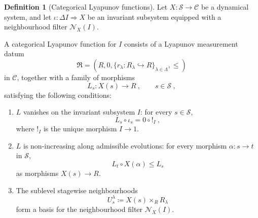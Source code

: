 \documentclass[a4paper,reqno,oneside]{amsart}
\theoremstyle{definition}
\newtheorem{definition}[theorem]{Definition}
\theoremstyle{remark}
\numberwithin{equation}{section}
\begin{document}
\begin{definition}[Categorical Lyapunov functions]\label{def: lyapunov function}
Let $ X\colon \mathcal S\to\mathcal C$ be a dynamical system, and let $ \iota\colon \Delta I\Rightarrow X$ be an invariant subsystem equipped with a neighbourhood filter $ \mathcal N_X(I)$.


A categorical Lyapunov function for $I$ consists of a Lyapunov measurement
datum
\begin{equation}
    \mathfrak R=(R,0,\{r_\lambda\colon R_\lambda\hookrightarrow R\}_{\lambda\in\Lambda},\leq)
\end{equation}
in $\mathcal C$, together with a family of morphisms
\begin{equation}
    L_s\colon X(s)\to R \ ,
    \qquad s\in\mathcal S \ ,
\end{equation}
satisfying the following conditions:

\begin{enumerate}
    \item $L$ vanishes on the invariant subsystem $I$: for every
    $s\in\mathcal S$,
    \begin{equation}
        L_s\circ \iota_s
        =
        0\circ {!}_I \ ,
    \end{equation}
    where ${!}_I$ is the unique morphism $I \to 1$.

    \item $L$ is non-increasing along admissible evolutions: for every
    morphism $\alpha\colon s\to t$ in $\mathcal S$,
    \begin{equation}
        L_t\circ X(\alpha)\leq L_s
    \end{equation}
    as morphisms $X(s)\to R$.

    \item The sublevel stagewise neighbourhoods
    \begin{equation}
        U^\lambda_s
        \coloneqq
        X(s)\times_R R_\lambda
    \end{equation}
    form a basis for the neighbourhood filter $\mathcal N_X(I)$.
\end{enumerate}
\end{definition}
\end{document}
